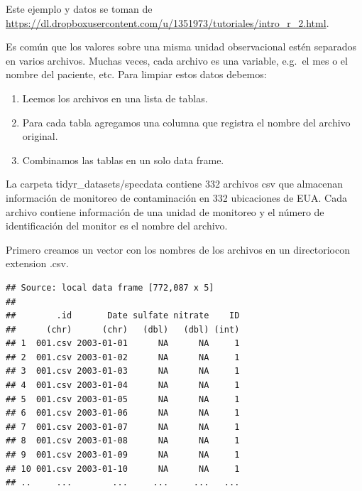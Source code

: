 \documentclass[]{article}
\newenvironment{Shaded}{\begin{snugshade}}{\end{snugshade}}
\newcommand{\KeywordTok}[1]{\textcolor[rgb]{0.13,0.29,0.53}{\textbf{{#1}}}}
\newcommand{\DataTypeTok}[1]{\textcolor[rgb]{0.13,0.29,0.53}{{#1}}}
\newcommand{\CharTok}[1]{\textcolor[rgb]{0.31,0.60,0.02}{{#1}}}
\newcommand{\StringTok}[1]{\textcolor[rgb]{0.31,0.60,0.02}{{#1}}}
\newcommand{\OtherTok}[1]{\textcolor[rgb]{0.56,0.35,0.01}{{#1}}}
\newcommand{\NormalTok}[1]{{#1}}
\begin{document}
Este ejemplo y datos se toman de
\url{https://dl.dropboxusercontent.com/u/1351973/tutoriales/intro_r_2.html}.

Es común que los valores sobre una misma unidad observacional estén
separados en varios archivos. Muchas veces, cada archivo es una
variable, e.g.~el mes o el nombre del paciente, etc. Para limpiar estos
datos debemos:

\begin{enumerate}
\def\labelenumi{\arabic{enumi}.}
\itemsep1pt\parskip0pt
\item
  Leemos los archivos en una lista de tablas.
\item
  Para cada tabla agregamos una columna que registra el nombre del
  archivo original.
\item
  Combinamos las tablas en un solo data frame.
\end{enumerate}

La carpeta tidyr\_datasets/specdata contiene 332 archivos csv que
almacenan información de monitoreo de contaminación en 332 ubicaciones
de EUA. Cada archivo contiene información de una unidad de monitoreo y
el número de identificación del monitor es el nombre del archivo.

Primero creamos un vector con los nombres de los archivos en un
directoriocon extension .csv.

\begin{Shaded}
\end{Shaded}

\begin{verbatim}
## Source: local data frame [772,087 x 5]
## 
##        .id       Date sulfate nitrate    ID
##      (chr)      (chr)   (dbl)   (dbl) (int)
## 1  001.csv 2003-01-01      NA      NA     1
## 2  001.csv 2003-01-02      NA      NA     1
## 3  001.csv 2003-01-03      NA      NA     1
## 4  001.csv 2003-01-04      NA      NA     1
## 5  001.csv 2003-01-05      NA      NA     1
## 6  001.csv 2003-01-06      NA      NA     1
## 7  001.csv 2003-01-07      NA      NA     1
## 8  001.csv 2003-01-08      NA      NA     1
## 9  001.csv 2003-01-09      NA      NA     1
## 10 001.csv 2003-01-10      NA      NA     1
## ..     ...        ...     ...     ...   ...
\end{verbatim}
\end{document}

